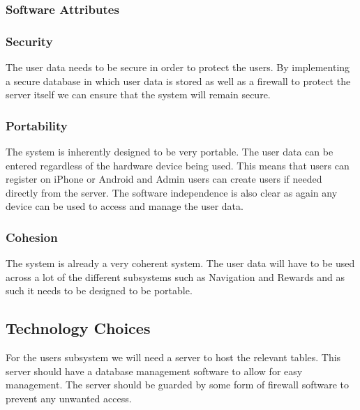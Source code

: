 \subsubsection{Software Attributes}
\subsubsection{Security}
The user data needs to be secure in order to protect the users. By implementing a secure database in which user data is stored as well as a firewall to protect the server itself we can ensure that the system will remain secure.

\subsubsection{Portability}
The system is inherently designed to be very portable. The user data can be entered regardless of the hardware device being used. This means that users can register on iPhone or Android and Admin users can create users if needed directly from the server. The software independence is also clear as again any device can be used to access and manage the user data.

\subsubsection{Cohesion}
The system is already a very coherent system. The user data will have to be used across a lot of the different subsystems such as Navigation and Rewards and as such it needs to be designed to be portable.

\subsection{Technology Choices}
For the users subsystem we will need a server to host the relevant tables. This server should have a database management software to allow for easy management. The server should be 
guarded by some form of firewall software to prevent any unwanted access. 